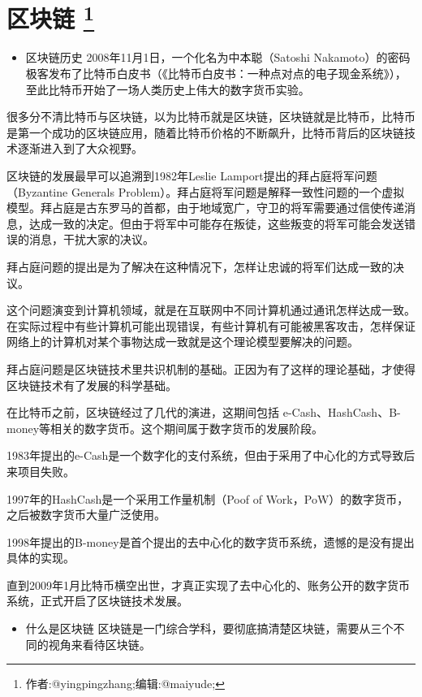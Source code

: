 \documentclass[]{ctexbook}
\providecommand{\tightlist}{%
  \setlength{\itemsep}{0pt}\setlength{\parskip}{0pt}}
\begin{document}
\chapter[区块链 ]{\texorpdfstring{区块链 \footnote{作者:@yingpingzhang;编辑:@maiyude;}}{区块链 }}

\begin{itemize}
\tightlist
\item
  区块链历史
  2008年11月1日，一个化名为中本聪（Satoshi Nakamoto）的密码极客发布了比特币白皮书（《比特币白皮书：一种点对点的电子现金系统》），至此比特币开始了一场人类历史上伟大的数字货币实验。
\end{itemize}

很多分不清比特币与区块链，以为比特币就是区块链，区块链就是比特币，比特币是第一个成功的区块链应用，随着比特币价格的不断飙升，比特币背后的区块链技术逐渐进入到了大众视野。

区块链的发展最早可以追溯到1982年Leslie Lamport提出的拜占庭将军问题（Byzantine Generals Problem）。拜占庭将军问题是解释一致性问题的一个虚拟模型。拜占庭是古东罗马的首都，由于地域宽广，守卫的将军需要通过信使传递消息，达成一致的决定。但由于将军中可能存在叛徒，这些叛变的将军可能会发送错误的消息，干扰大家的决议。

拜占庭问题的提出是为了解决在这种情况下，怎样让忠诚的将军们达成一致的决议。

这个问题演变到计算机领域，就是在互联网中不同计算机通过通讯怎样达成一致。在实际过程中有些计算机可能出现错误，有些计算机有可能被黑客攻击，怎样保证网络上的计算机对某个事物达成一致就是这个理论模型要解决的问题。

拜占庭问题是区块链技术里共识机制的基础。正因为有了这样的理论基础，才使得区块链技术有了发展的科学基础。

在比特币之前，区块链经过了几代的演进，这期间包括 e-Cash、HashCash、B-money等相关的数字货币。这个期间属于数字货币的发展阶段。

1983年提出的e-Cash是一个数字化的支付系统，但由于采用了中心化的方式导致后来项目失败。

1997年的HashCash是一个采用工作量机制（Poof of Work，PoW）的数字货币，之后被数字货币大量广泛使用。

1998年提出的B-money是首个提出的去中心化的数字货币系统，遗憾的是没有提出具体的实现。

直到2009年1月比特币横空出世，才真正实现了去中心化的、账务公开的数字货币系统，正式开启了区块链技术发展。

\begin{itemize}
\tightlist
\item
  什么是区块链
  区块链是一门综合学科，要彻底搞清楚区块链，需要从三个不同的视角来看待区块链。
\end{itemize}
\end{document}
